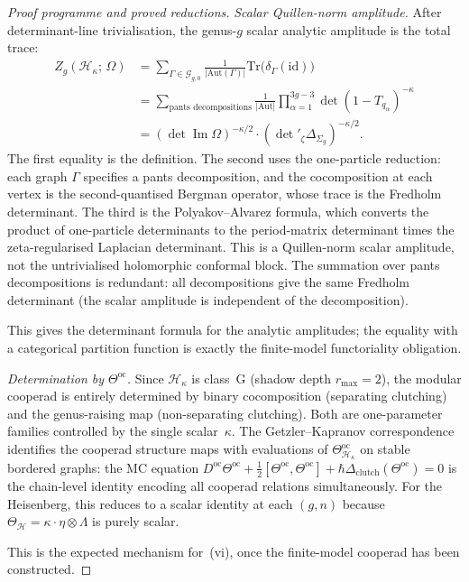 \documentclass[11pt]{article}
\newcommand{\cH}{\mathcal{H}}
\newcommand{\id}{\mathrm{id}}
\begin{document}
\begin{proof}[Proof programme and proved reductions]
\emph{Scalar Quillen-norm amplitude.}  After determinant-line
trivialisation, the genus-$g$ scalar analytic amplitude is the
total trace:
\begin{align*}
  Z_g(\cH_\kappa;\,\Omega)
  &= \sum_{\Gamma \in \mathcal{G}_{g,0}}
  \frac{1}{|\mathrm{Aut}(\Gamma)|}
  \mathrm{Tr}\bigl(\delta_\Gamma(\id)\bigr)
  \\
  &= \sum_{\text{pants decompositions}}
  \frac{1}{|\mathrm{Aut}|}
  \prod_{\alpha=1}^{3g-3}
  \det(1 - T_{q_\alpha})^{-\kappa}
  \\
  &= (\det\operatorname{Im}\Omega)^{-\kappa/2}
  \cdot (\det'{}_\zeta \Delta_{\Sigma_g})^{-\kappa/2}.
\end{align*}
The first equality is the definition.  The second uses the
one-particle reduction: each graph $\Gamma$ specifies a pants
decomposition, and the cocomposition at each vertex is the
second-quantised Bergman operator, whose trace is the Fredholm
determinant.  The third is the Polyakov--Alvarez formula,
which converts the product of one-particle determinants to
  the period-matrix determinant times the zeta-regularised
  Laplacian determinant.  This is a Quillen-norm scalar amplitude,
  not the untrivialised holomorphic conformal block.  The summation
  over pants decompositions
is redundant: all decompositions give the same Fredholm
  determinant (the scalar amplitude is independent of the
decomposition).

This gives the determinant formula for the analytic amplitudes;
the equality with a categorical partition function is exactly the
finite-model functoriality obligation.

\emph{Determination by $\Theta^{\mathrm{oc}}$.}  Since
$\cH_\kappa$ is class~G (shadow depth $r_{\max} = 2$), the
modular cooperad is entirely determined by binary cocomposition
(separating clutching) and the genus-raising map (non-separating
clutching).  Both are one-parameter families controlled by the
single scalar~$\kappa$.  The Getzler--Kapranov correspondence
identifies the cooperad structure maps with evaluations of
$\Theta^{\mathrm{oc}}_{\cH_\kappa}$ on stable bordered graphs:
the MC equation
$D^{\mathrm{oc}}\Theta^{\mathrm{oc}} +
\tfrac{1}{2}[\Theta^{\mathrm{oc}}, \Theta^{\mathrm{oc}}]
+ \hbar\Delta_{\mathrm{clutch}}(\Theta^{\mathrm{oc}}) = 0$
is the chain-level identity encoding all cooperad relations
simultaneously.  For the Heisenberg, this reduces to a scalar
identity at each $(g,n)$ because $\Theta_{\cH} = \kappa \cdot
\eta \otimes \Lambda$ is purely scalar.

This is the expected mechanism for~(vi), once the finite-model
cooperad has been constructed.
\end{proof}
\end{document}
